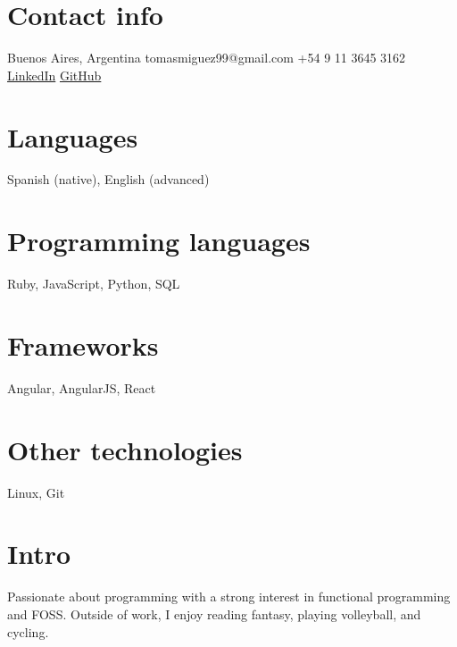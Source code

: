 \documentclass{cv-style}     %
\begin{document}
\lastupdated

\begin{aside}
%
\section{Contact info}
Buenos Aires, Argentina
tomasmiguez99@gmail.com
+54 9 11 3645 3162
\href{https://www.linkedin.com/in/tom\%C3\%A1s-miguez-a53327241}{LinkedIn}
\href{https://github.com/tomasmiguez}{GitHub}
%
\section{Languages}
Spanish (native),
English (advanced)
%
\section{Programming languages}
Ruby, JavaScript, Python, SQL
%
\section{Frameworks}
Angular, AngularJS, React
%
\section{Other technologies}
Linux, Git
%
\end{aside}
\vspace{0.2cm}
\section{Intro}
  \vspace{-0.2cm}
  Passionate about programming with a strong interest in functional programming and FOSS.
  Outside of work, I enjoy reading fantasy, playing volleyball, and cycling.
\end{document}

